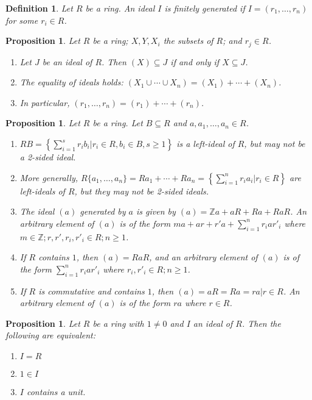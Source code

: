 \documentclass[a4paper,sfsidenotes,openany]{tufte-book}
\theoremstyle{theorem}
\newtheorem{proposition}[theorem]{Proposition}
\newtheorem{definition}[theorem]{Definition}
\begin{document}
\begin{fullwidth}
\begin{definition}
Let $R$ be a ring. An ideal $I$ is \textit{{\color{blue} finitely generated}} if $I=(r_1, \ldots, r_n)$ for some $r_i \in R$.\\
\end{definition}
\>

\begin{proposition}
Let $R$ be a ring; $X, Y, X_i$ the subsets of $R$; and $r_j \in R$.
\begin{enumerate}[label=(\roman*),leftmargin=0pt, itemindent=4em, align=left]
\item Let $J$ be an ideal of $R$. Then $(X) \subseteq J$ if and only if $X \subseteq J$.
\item The equality of ideals holds: $(X_1 \cup \cdots \cup X_n) = (X_1) + \cdots + (X_n)$.
\item In particular, $(r_1, \ldots, r_n) = (r_1) + \cdots + (r_n)$.
\end{enumerate}
\end{proposition}
\>

\begin{proposition}
Let $R$ be a ring. Let $B\subseteq R$ and $a, a_1, \ldots, a_n \in R$.
\begin{enumerate}[label=(\roman*),leftmargin=0pt, itemindent=4em, align=left]
\item $RB = \left\{\sum_{i=1}^{s} r_i b_i | r_i \in R, b_i \in B, s \geq 1 \right\}$ is a left-ideal of $R$, but may not be a 2-sided ideal.
\item More generally, $R\{a_1, \ldots, a_n\} = Ra_1 + \cdots + Ra_n = \left\{\sum_{i=1}^{n} r_i a_i | r_i \in R \right\}$ are left-ideals of $R$, but they may not be 2-sided ideals.
\item The ideal $(a)$ generated by $a$ is given by $(a)=\mathbb{Z}a + aR + Ra + RaR$. An arbitrary element of $(a)$ is of the form $ma + ar + r'a + \sum_{i=1}^{n} r_i a r'_i$ where $m\in \mathbb{Z}; r, r', r_i, r'_i \in R; n \geq 1$.
\item If $R$ contains $1$, then $(a)=RaR$, and an arbitrary element of $(a)$ is of the form $\sum_{i=1}^{n} r_i a r'_i$  where $r_i, r'_i \in R; n \geq 1$.
\item If $R$ is commutative and contains $1$, then $(a)=aR=Ra={ra|r\in R}$. An arbitrary element of $(a)$ is of the form $ra$ where $r \in R$.
\end{enumerate}
\end{proposition}
\>

\begin{proposition}
Let $R$ be a ring with $1 \neq 0$ and $I$ an ideal of $R$. Then the following are equivalent:
\begin{enumerate}[label=(\roman*),leftmargin=0pt, itemindent=4em, align=left]
\item $I = R$
\item $1 \in I$
\item $I$ contains a unit.	
\end{enumerate}
\end{proposition}
\>


\end{fullwidth}
\end{document}
